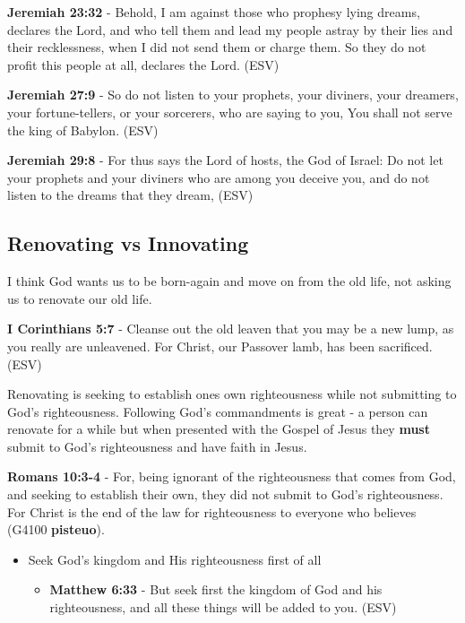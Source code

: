 \documentclass[11pt]{article}
\begin{document}
\textbf{Jeremiah 23:32} - Behold, I am against those who prophesy lying dreams, declares the Lord, and who tell them and lead my people astray by their lies and their recklessness, when I did not send them or charge them. So they do not profit this people at all, declares the Lord. (ESV)

\textbf{Jeremiah 27:9} - So do not listen to your prophets, your diviners, your dreamers, your fortune-tellers, or your sorcerers, who are saying to you, You shall not serve the king of Babylon. (ESV)

\textbf{Jeremiah 29:8} - For thus says the Lord of hosts, the God of Israel: Do not let your prophets and your diviners who are among you deceive you, and do not listen to the dreams that they dream, (ESV)

\subsection{Renovating vs Innovating}
\label{sec:org69efd17}
I think God wants us to be born-again and move on from the old life,
not asking us to renovate our old life.

\textbf{I Corinthians 5:7} - Cleanse out the old leaven that you may be a new lump, as you really are unleavened. For Christ, our Passover lamb, has been sacrificed. (ESV)

Renovating is seeking to establish ones own righteousness while not submitting to God's righteousness.
Following God's commandments is great - a person can renovate for a while but when presented with the Gospel of Jesus they \textbf{must} submit to God's righteousness and have faith in Jesus.

\textbf{Romans 10:3-4} - For, being ignorant of the righteousness that comes from God, and seeking to establish their own, they did not submit to God's righteousness. For Christ is the end of the law for righteousness to everyone who believes (G4100 \textbf{pisteuo}).

\begin{itemize}
\item Seek God's kingdom and His righteousness first of all
\begin{itemize}
\item \textbf{Matthew 6:33} - But seek first the kingdom of God and his righteousness, and all these things will be added to you. (ESV)
\end{itemize}
\end{itemize}
\end{document}
